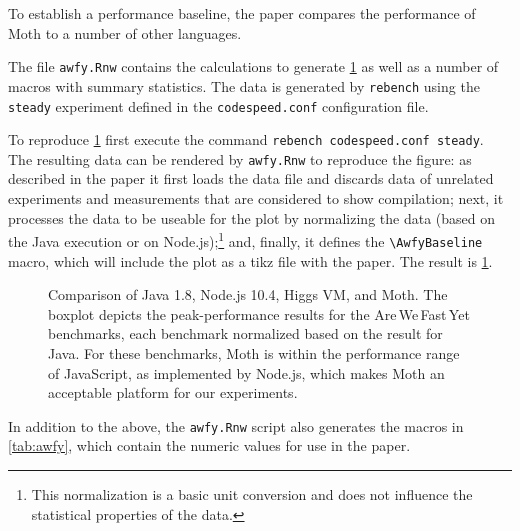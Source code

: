 \documentclass[a4paper,USenglish]{darts-v2019}
\def\AWFY{Are\,We\,Fast\,Yet\xspace}
\newcommand{\code}[1]{\texttt{#1}}
\begin{document}
To establish a performance baseline,
the paper compares the performance of Moth
to a number of other languages.

The file \code{awfy.Rnw} contains the calculations to generate
\cref{fig:awfy-baseline} as well as a number of macros with summary statistics.
The data is generated by \code{rebench} using the \code{steady} experiment
defined in the \code{codespeed.conf} configuration file.

To reproduce \cref{fig:awfy-baseline}
first execute the command \code{rebench codespeed.conf steady}.
The resulting data can be rendered by \code{awfy.Rnw} to reproduce the figure:
as described in the paper
it first loads the data file
and discards data of unrelated experiments
and measurements that are considered to show compilation;
next, it processes the data to be useable for the plot
by normalizing the data (based on the Java execution or on Node.js);\footnote{
This normalization is a basic unit conversion and does not influence the
statistical properties of the data.
}
and, finally, it defines the \code{\textbackslash{}AwfyBaseline} macro,
which will include the plot as a tikz file with the paper.
The result is \cref{fig:awfy-baseline}.

\begin{figure}[htb]
  \centering
	\AwfyBaseline{}
	\caption{Comparison of Java 1.8, Node.js 10.4, Higgs VM, and Moth.
  The boxplot depicts the peak-performance results for the \AWFY benchmarks,
  each benchmark normalized based on the result for Java.
  For these benchmarks, Moth is within the performance range
  of JavaScript, as implemented by Node.js,
  which makes Moth an acceptable platform for our experiments.}
	\label{fig:awfy-baseline}
\end{figure}

In addition to the above, the \code{awfy.Rnw} script also
generates the macros in \cref{tab:awfy},
which contain the numeric values for use in the paper.
\end{document}
